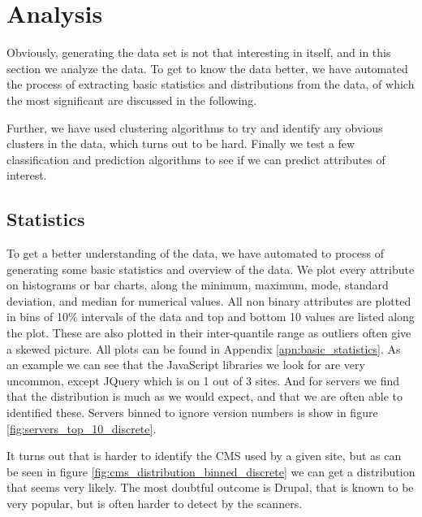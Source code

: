 \section{Analysis}
\label{sec:analysis}

Obviously, generating the data set is not that interesting in itself, and in this section we analyze the data. To get to know the data better, we have automated the process of extracting basic statistics and distributions from the data, of which the most significant are discussed in the following.

Further, we have used clustering algorithms to try and identify any obvious clusters in the data, which turns out to be hard. Finally we test a few classification and prediction algorithms to see if we can predict attributes of interest.

\subsection{Statistics}
\label{subsec:statistics}
To get a better understanding of the data, we have automated to process of generating some basic statistics and overview of the data. We plot every attribute on histograms or bar charts, along the minimum, maximum, mode, standard deviation, and median for numerical values. All non binary attributes are plotted in bins of 10\% intervals of the data and top and bottom 10 values are listed along the plot. These are also plotted in their inter-quantile range as outliers often give a skewed picture. All plots can be found in Appendix \ref{apn:basic_statistics}. As an example we can see that the JavaScript libraries we look for are very uncommon, except JQuery which is on 1 out of 3 sites. And for servers we find that the distribution is much as we would expect, and that we are often able to identified these. Servers binned to ignore version numbers is show in figure \ref{fig:servers_top_10_discrete}.


It turns out that is harder to identify the CMS used by a given site, but as can be seen in figure \ref{fig:cms_distribution_binned_discrete} we can get a distribution that seems very likely. The most doubtful outcome is Drupal, that is known to be very popular, but is often harder to detect by the scanners.



